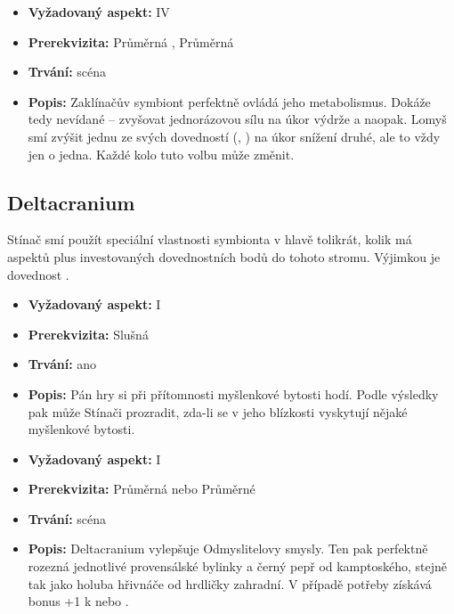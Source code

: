 \documentclass[../main.tex]{subfiles}
\begin{document}
\begin{specialita}
\begin{itemize}
	\item \textbf{Vyžadovaný aspekt:} IV
	\item \textbf{Prerekvizita:} Průměrná , Průměrná 
	\item \textbf{Trvání:} scéna
	\item \textbf{Popis:} Zaklínačův symbiont perfektně ovládá jeho metabolismus. Dokáže tedy nevídané – zvyšovat jednorázovou sílu na úkor výdrže a naopak. Lomyš smí zvýšit jednu ze svých dovedností (, ) na úkor snížení druhé, ale to vždy jen o jedna. Každé kolo tuto volbu může změnit.
\end{itemize}
\end{specialita}


\subsection{Deltacranium}
\label{sec:lopr-delta}

Stínač smí použít speciální vlastnosti symbionta v hlavě tolikrát, kolik má aspektů plus investovaných dovednostních bodů do tohoto stromu. Výjimkou je dovednost .

\begin{specialita}
\begin{itemize}
	\item \textbf{Vyžadovaný aspekt:} I
	\item \textbf{Prerekvizita:} Slušná 
	\item \textbf{Trvání:} ano
	\item \textbf{Popis:} Pán hry si při přítomnosti myšlenkové bytosti hodí. Podle výsledky pak může Stínači prozradit, zda-li se v jeho blízkosti vyskytují nějaké myšlenkové bytosti.
\end{itemize}
\end{specialita}

\begin{specialita}
\begin{itemize}
	\item \textbf{Vyžadovaný aspekt:} I
	\item \textbf{Prerekvizita:} Průměrná  nebo Průměrné 
	\item \textbf{Trvání:} scéna
	\item \textbf{Popis:} Deltacranium vylepšuje Odmyslitelovy smysly. Ten pak perfektně rozezná jednotlivé provensálské bylinky a černý pepř od kamptoského, stejně tak jako holuba hřivnáče od hrdličky zahradní. V případě potřeby získává bonus +1 k  nebo .
\end{itemize}
\end{specialita}
\end{document}

